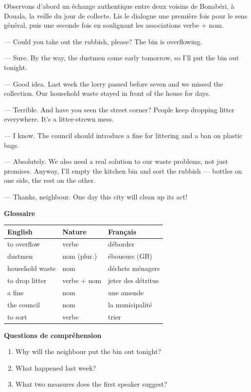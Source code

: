 \documentclass[11pt]{article}
\begin{document}
Observons d'abord un échange authentique entre deux voisins de Bonabéri, à Douala, la veille du jour de collecte. Lis le dialogue une première fois pour le sens général, puis une seconde fois en soulignant les associations verbe + nom.

\begin{textebox}
— Could you take out the rubbish, please? The bin is overflowing.

— Sure. By the way, the dustmen come early tomorrow, so I'll put the bin out tonight.

— Good idea. Last week the lorry passed before seven and we missed the collection. Our household waste stayed in front of the house for days.

— Terrible. And have you seen the street corner? People keep dropping litter everywhere. It's a litter-strewn mess.

— I know. The council should introduce a fine for littering and a ban on plastic bags.

— Absolutely. We also need a real solution to our waste problems, not just promises. Anyway, I'll empty the kitchen bin and sort the rubbish — bottles on one side, the rest on the other.

— Thanks, neighbour. One day this city will clean up its act!
\end{textebox}

\textbf{Glossaire}

\begin{center}
\begin{tabularx}{\linewidth}{|l|l|X|}
\hline
\rowcolor{popblueL} English & Nature & Français \\
\hline
to overflow & verbe & déborder \\
\hline
dustmen & nom (plur.) & éboueurs (GB) \\
\hline
household waste & nom & déchets ménagers \\
\hline
to drop litter & verbe + nom & jeter des détritus \\
\hline
a fine & nom & une amende \\
\hline
the council & nom & la municipalité \\
\hline
to sort & verbe & trier \\
\hline
\end{tabularx}
\end{center}

\textbf{Questions de compréhension}
\begin{enumerate}
\item Why will the neighbour put the bin out tonight?
\item What happened last week?
\item What two measures does the first speaker suggest?
\end{enumerate}
\end{document}
